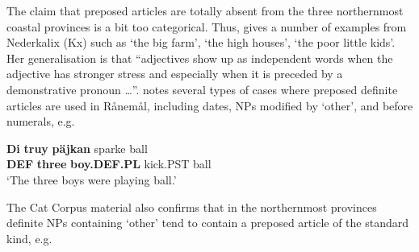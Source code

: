 
The claim that preposed articles are totally absent from the three northernmost coastal provinces is a bit too categorical. Thus, \citet[141]{Rutberg1924} gives a number of examples from Nederkalix (Kx) such as ‘the big farm’, ‘the high houses’, ‘the poor little kids’. Her generalisation is that “adjectives show up as independent words when the adjective has stronger stress and especially when it is preceded by a demonstrative pronoun …”. \citet[114]{Wikberg2004} notes several types of cases where preposed definite articles are used in Rånemål, including dates, NPs modified by  ‘other’, and before numerals, e.g.


\ea\label{}
\gll \textbf{Di} \textbf{truy} \textbf{päjkan} sparke  ball\\
\textbf{DEF} \textbf{three} \textbf{boy.DEF.PL} kick.PST  ball\\
\glt ‘The three boys were playing ball.’
\z

The Cat Corpus material also confirms that in the northernmost provinces definite NPs containing ‘other’ tend to contain a preposed article of the standard kind, e.g. 


\ea\label{}
\z
\z 


